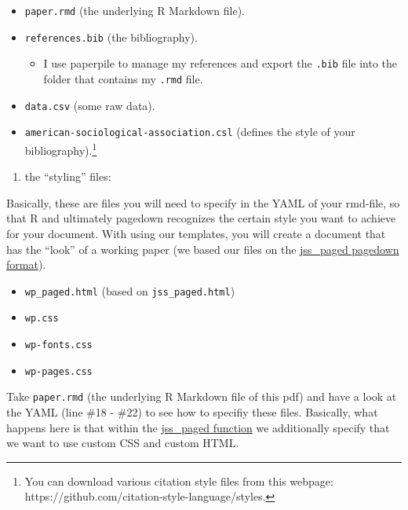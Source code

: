 \documentclass[
  letterpaper,
  DIV=11,
  numbers=noendperiod]{scrartcl}
\providecommand{\tightlist}{%
  \setlength{\itemsep}{0pt}\setlength{\parskip}{0pt}}\usepackage{longtable,booktabs,array}
\begin{document}
\begin{itemize}
\tightlist
\item
  \texttt{paper.rmd} (the underlying R Markdown file).
\item
  \texttt{references.bib} (the bibliography).

  \begin{itemize}
  \tightlist
  \item
    I use paperpile to manage my references and export the \texttt{.bib}
    file into the folder that contains my \texttt{.rmd} file.
  \end{itemize}
\item
  \texttt{data.csv} (some raw data).
\item
  \texttt{american-sociological-association.csl} (defines the style of
  your bibliography).\footnote{You can download various citation style
    files from this webpage:
    https://github.com/citation-style-language/styles.}
\end{itemize}

\begin{enumerate}
\def\labelenumi{\arabic{enumi}.}
\setcounter{enumi}{1}
\tightlist
\item
  the ``styling'' files:
\end{enumerate}

Basically, these are files you will need to specify in the YAML of your
rmd-file, so that R and ultimately pagedown recognizes the certain style
you want to achieve for your document. With using our templates, you
will create a document that has the ``look'' of a working paper (we
based our files on the
\href{https://github.com/rstudio/pagedown\#journal-of-statistical-software-article-pagedownjss_paged}{jss\_paged
pagedown format}).

\begin{itemize}
\tightlist
\item
  \texttt{wp\_paged.html} (based on \texttt{jss\_paged.html})
\item
  \texttt{wp.css}
\item
  \texttt{wp-fonts.css}
\item
  \texttt{wp-pages.css}
\end{itemize}

Take \texttt{paper.rmd} (the underlying R Markdown file of this pdf) and
have a look at the YAML (line \#18 - \#22) to see how to specifiy these
files. Basically, what happens here is that within the
\href{https://rdrr.io/cran/pagedown/man/jss_paged.html}{jss\_paged
function} we additionally specify that we want to use custom CSS and
custom HTML.
\end{document}
